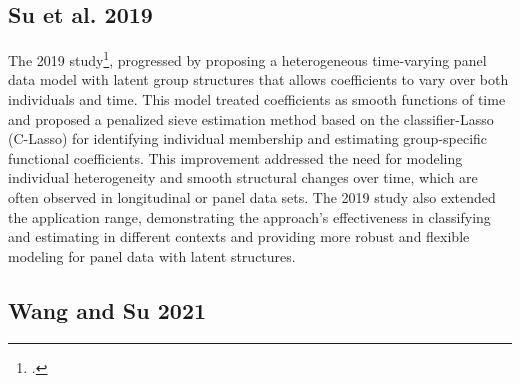 \documentclass[UTF8,a4paper,10pt]{article}
\begin{document}




\subsection{Su et al. 2019}
The 2019 study\footcite{Su2019}, progressed by proposing a heterogeneous time-varying panel data model with latent group structures that allows coefficients to vary over both individuals and time. This model treated coefficients as smooth functions of time and proposed a penalized sieve estimation method based on the classifier-Lasso (C-Lasso) for identifying individual membership and estimating group-specific functional coefficients. This improvement addressed the need for modeling individual heterogeneity and smooth structural changes over time, which are often observed in longitudinal or panel data sets. The 2019 study also extended the application range, demonstrating the approach's effectiveness in classifying and estimating in different contexts and providing more robust and flexible modeling for panel data with latent structures.

\subsection{Wang and Su 2021}
\end{document}
